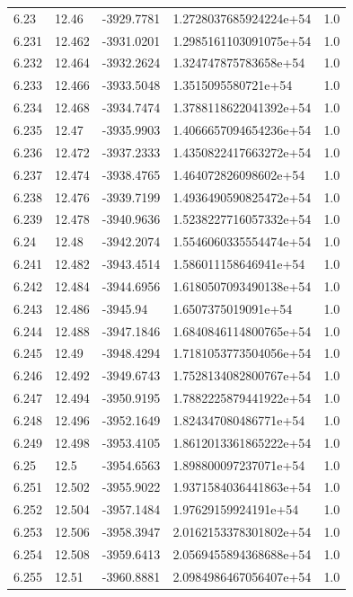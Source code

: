 \begin{tabular}{lllll}
6.23 & 12.46 & -3929.7781 & 1.2728037685924224e+54 & 1.0 \\
6.231 & 12.462 & -3931.0201 & 1.2985161103091075e+54 & 1.0 \\
6.232 & 12.464 & -3932.2624 & 1.324747875783658e+54 & 1.0 \\
6.233 & 12.466 & -3933.5048 & 1.3515095580721e+54 & 1.0 \\
6.234 & 12.468 & -3934.7474 & 1.3788118622041392e+54 & 1.0 \\
6.235 & 12.47 & -3935.9903 & 1.4066657094654236e+54 & 1.0 \\
6.236 & 12.472 & -3937.2333 & 1.4350822417663272e+54 & 1.0 \\
6.237 & 12.474 & -3938.4765 & 1.464072826098602e+54 & 1.0 \\
6.238 & 12.476 & -3939.7199 & 1.4936490590825472e+54 & 1.0 \\
6.239 & 12.478 & -3940.9636 & 1.5238227716057332e+54 & 1.0 \\
6.24 & 12.48 & -3942.2074 & 1.5546060335554474e+54 & 1.0 \\
6.241 & 12.482 & -3943.4514 & 1.586011158646941e+54 & 1.0 \\
6.242 & 12.484 & -3944.6956 & 1.6180507093490138e+54 & 1.0 \\
6.243 & 12.486 & -3945.94 & 1.6507375019091e+54 & 1.0 \\
6.244 & 12.488 & -3947.1846 & 1.6840846114800765e+54 & 1.0 \\
6.245 & 12.49 & -3948.4294 & 1.7181053773504056e+54 & 1.0 \\
6.246 & 12.492 & -3949.6743 & 1.7528134082800767e+54 & 1.0 \\
6.247 & 12.494 & -3950.9195 & 1.7882225879441922e+54 & 1.0 \\
6.248 & 12.496 & -3952.1649 & 1.824347080486771e+54 & 1.0 \\
6.249 & 12.498 & -3953.4105 & 1.8612013361865222e+54 & 1.0 \\
6.25 & 12.5 & -3954.6563 & 1.898800097237071e+54 & 1.0 \\
6.251 & 12.502 & -3955.9022 & 1.9371584036441863e+54 & 1.0 \\
6.252 & 12.504 & -3957.1484 & 1.97629159924191e+54 & 1.0 \\
6.253 & 12.506 & -3958.3947 & 2.0162153378301802e+54 & 1.0 \\
6.254 & 12.508 & -3959.6413 & 2.0569455894368688e+54 & 1.0 \\
6.255 & 12.51 & -3960.8881 & 2.0984986467056407e+54 & 1.0 \\

\end{tabular}
